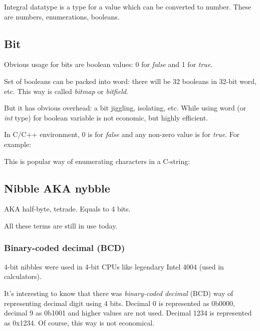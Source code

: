 
Integral datatype is a type for a value which can be converted to number.
These are numbers, enumerations, booleans.

\subsection{Bit}

Obvious usage for bits are boolean values: 0 for \emph{false} and 1 for \emph{true}.

Set of booleans can be packed into \gls{word}: there will be 32 booleans in 32-bit word, etc.
This way is called \emph{bitmap} or \emph{bitfield}.

But it has obvious overhead: a bit jiggling, isolating, etc.
While using \gls{word} (or \emph{int} type) for boolean variable is not economic, but highly efficient.

In C/C++ environment, 0 is for \emph{false} and any non-zero value is for \emph{true}.
For example:



This is popular way of enumerating characters in a C-string:



\subsection{Nibble AKA nybble}

\ac{AKA} half-byte, tetrade.
Equals to 4 bits.

All these terms are still in use today.

\subsubsection{Binary-coded decimal (\ac{BCD})}
\label{BCD}


4-bit nibbles were used in 4-bit CPUs like legendary Intel 4004 (used in calculators).

It's interesting to know that there was \emph{binary-coded decimal} (\ac{BCD}) way of representing decimal digit using 4 bits.
Decimal 0 is represented as 0b0000, decimal 9 as 0b1001 and higher values are not used.
Decimal 1234 is represented as 0x1234.
Of course, this way is not economical.


